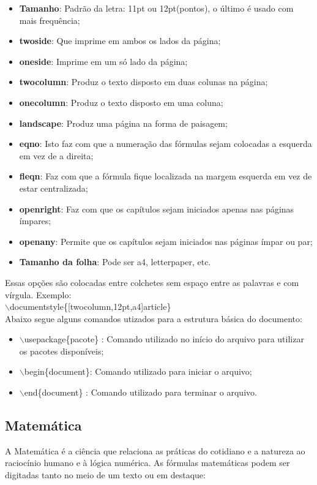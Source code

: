 \documentclass[12pt]{article}
\begin{document}
			\begin{itemize}
				\item \textbf {Tamanho}: Padrão da letra: 11pt ou 12pt(pontos), o último é usado com mais frequência;
				\item \textbf {twoside}: Que imprime em ambos os lados da página;
				\item \textbf {oneside}: Imprime em um só lado da página;
				\item \textbf {twocolumn}: Produz o texto disposto em duas colunas na página;
				\item \textbf {onecolumn}: Produz o texto disposto em uma coluna;
				\item \textbf {landscape}: Produz uma página na forma de paisagem;
				\item \textbf {eqno}: Isto faz com que a numeração das fórmulas sejam colocadas a esquerda em vez
				de a direita;
				\item \textbf {fleqn}: Faz com que a fórmula fique localizada na margem esquerda em vez de estar centralizada;
				\item \textbf {openright}: Faz com que os capítulos sejam iniciados apenas nas páginas ímpares;
				\item \textbf {openany}: Permite que os capítulos sejam iniciados nas páginas ímpar ou par;
				\item \textbf {Tamanho da folha}: Pode ser a4, letterpaper, etc.
			\end{itemize}
			
			Essas opções são colocadas entre colchetes sem espaço entre as palavras e com vírgula. Exemplo:\\
			$\backslash$documentstyle\{[twocolumn,12pt,a4]{article}\} \\
			
			Abaixo segue alguns comandos utizados para a estrutura básica do documento:
			
			
			\begin{itemize}
				\item $\backslash$usepackage\{{pacote}\} : Comando utilizado no início do arquivo para utilizar os pacotes disponíveis;
				\item $\backslash$begin\{{document}\}: Comando utilizado para iniciar o arquivo;
				\item $\backslash$end\{{document}\} : Comando utilizado para terminar o arquivo.
			\end{itemize}
		
		
		\subsection{Matemática}
			A Matemática é a ciência que relaciona as práticas do cotidiano e a natureza ao raciocínio humano e à lógica numérica.
			As fórmulas matemáticas podem ser digitadas tanto no meio de um texto ou em destaque:
			
\end{document}
